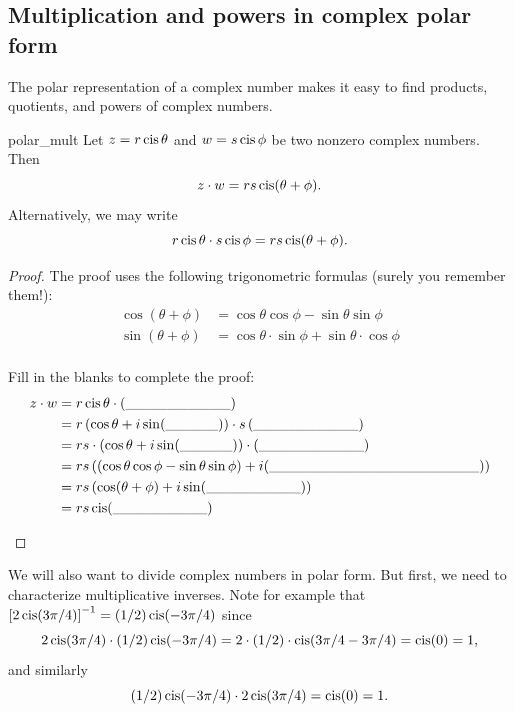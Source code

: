 {\subsection{Multiplication and powers in complex polar form}

The polar representation of a complex number makes it easy to find
products, quotients, and powers of complex numbers. 

\begin{prop}{polar_mult} Let $z=r\operatorname{cis}\theta$ and $w=s\operatorname{cis}\phi$
be two nonzero complex numbers. Then 
\[z \cdot w=rs\operatorname{cis}(\theta+\phi).\]
Alternatively, we may write
\[r \operatorname{cis} \theta \cdot s \operatorname{cis} \phi =rs\operatorname{cis}(\theta+\phi).\]
 \end{prop}

\begin{proof}
The proof uses the following trigonometric formulas (surely you remember them!):
\newline
\begin{align*}
 \cos(\theta + \phi ) &= \cos\theta\cos\phi - \sin\theta\sin\phi \\
 \sin(\theta + \phi ) &= \cos\theta \cdot \sin\phi + \sin\theta \cdot \cos\phi \\
\end{align*}
\begin{exercise}{24} Fill in the blanks to complete the proof:
\begin{align*}
z \cdot w &= r\operatorname{cis}\theta \cdot (\_\_\_\_\_\_\_\_\_\_) \\
 &= r \left( \cos\theta + i \sin(\_\_\_\_\_) \right) \cdot s  \left( \_\_\_\_\_\_\_\_\_\_ \right) \\
 &=  rs \cdot \left( \cos\theta + i \sin(\_\_\_\_\_) \right) \cdot  \left( \_\_\_\_\_\_\_\_\_\_\right) \\
 &=  rs \left( (\cos\theta \cos\phi   - \sin\theta \sin\phi)  + i(\_\_\_\_\_\_\_\_\_\_\_\_\_\_\_\_\_\_\_\_) \right)\\
 &=  rs  \left( \cos(\theta + \phi) + i\sin( \_\_\_\_\_\_\_\_\_) \right) \\
 &=  r s  \operatorname{cis}( \_\_\_\_\_\_\_\_\_) \\
\end{align*}
\end{exercise}
\end{proof}

We will also want to divide complex numbers in polar form. But first, we need to characterize multiplicative inverses. Note for example that $\left[2 \operatorname{cis} (3\pi / 4)\right]^{-1} = (1/2) \operatorname{cis} (-3 \pi/4)$ since
\[ 2 \operatorname{cis} (3\pi / 4) \cdot (1/2) \operatorname{cis} (-3 \pi/4) = 2 \cdot (1/2) \cdot \operatorname{cis}( 3\pi/4 -3 \pi /4) = \operatorname{cis}(0) = 1, \]
and similarly
\[ (1/2) \operatorname{cis} (-3 \pi/4) \cdot 2 \operatorname{cis} (3\pi / 4)  = \operatorname{cis}(0) = 1. \]

}
